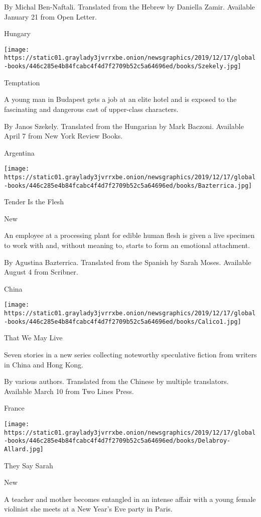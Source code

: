  By Michal Ben-Naftali. Translated from the Hebrew by Daniella Zamir.
Available January 21 from Open Letter.

Hungary

\texttt{[image: https://static01.graylady3jvrrxbe.onion/newsgraphics/2019/12/17/global-books/446c285e4b84fcabc4f4d7f2709b52c5a64696ed/books/Szekely.jpg]}

Temptation

A young man in Budapest gets a job at an elite hotel and is exposed to
the fascinating and dangerous cast of upper-class characters.

 By Janos Szekely. Translated from the Hungarian by Mark Baczoni.
Available April 7 from New York Review Books.

Argentina

\texttt{[image: https://static01.graylady3jvrrxbe.onion/newsgraphics/2019/12/17/global-books/446c285e4b84fcabc4f4d7f2709b52c5a64696ed/books/Bazterrica.jpg]}

Tender Is the Flesh

New

An employee at a processing plant for edible human flesh is given a live
specimen to work with and, without meaning to, starts to form an
emotional attachment.

 By Agustina Bazterrica. Translated from the Spanish by Sarah Moses.
Available August 4 from Scribner.

China

\texttt{[image: https://static01.graylady3jvrrxbe.onion/newsgraphics/2019/12/17/global-books/446c285e4b84fcabc4f4d7f2709b52c5a64696ed/books/Calico1.jpg]}

That We May Live

Seven stories in a new series collecting noteworthy speculative fiction
from writers in China and Hong Kong.

 By various authors. Translated from the Chinese by multiple
translators. Available March 10 from Two Lines Press.

France

\texttt{[image: https://static01.graylady3jvrrxbe.onion/newsgraphics/2019/12/17/global-books/446c285e4b84fcabc4f4d7f2709b52c5a64696ed/books/Delabroy-Allard.jpg]}

They Say Sarah

New

A teacher and mother becomes entangled in an intense affair with a young
female violinist she meets at a New Year's Eve party in Paris.

